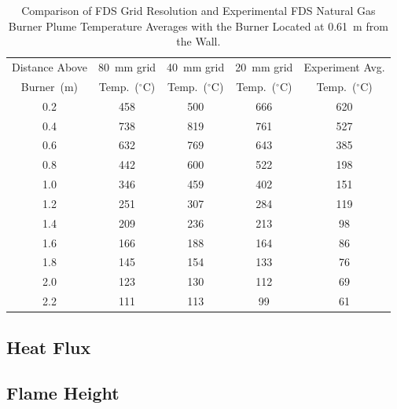 \documentclass[twoside]{uocthesis}
\begin{document}
\begin{table}
	\small
	\centering
	\begin{tabular}{|c|c|c|c|c|}
		\hline Distance Above  & 80~mm grid      & 40~mm grid     & 20~mm grid 		& Experiment Avg. \\
		Burner~(m)	   & Temp.~($^{\circ}$C) & Temp.~($^{\circ}$C) & Temp.~($^{\circ}$C)  & Temp.~($^{\circ}$C)	\\ \hline
		\hline 0.2 			   & 458						& 500					& 666 			& 620 	\\
		\hline 0.4			   & 738					   	& 819					& 761			& 527 	\\
		\hline 0.6			   & 632						& 769					& 643			& 385 	\\
		\hline 0.8			   & 442						& 600					& 522			& 198	\\
		\hline 1.0			   & 346						& 459 					& 402			& 151	\\
		\hline 1.2			   & 251						& 307 					& 284			& 119	\\
		\hline 1.4			   & 209						& 236 					& 213			& 98	\\
		\hline 1.6			   & 166						& 188 					& 164			& 86	\\
		\hline 1.8			   & 145						& 154 					& 133			& 76	\\
		\hline 2.0			   & 123						& 130 					& 112			& 69	\\
		\hline 2.2			   & 111						& 113 					& 99			& 61	\\
		\hline
	\end{tabular}
	\caption[Comparison of FDS Grid Resolution and Experimental FDS Natural Gas Burner Plume Temperatures]{Comparison of FDS Grid Resolution and Experimental FDS Natural Gas Burner Plume Temperature Averages with the Burner Located at 0.61~m from the Wall.}
	\label{tab:FDSRI_Exp_Plume}
\end{table}











\subsection{Heat Flux}

\subsection{Flame Height}
\end{document}
